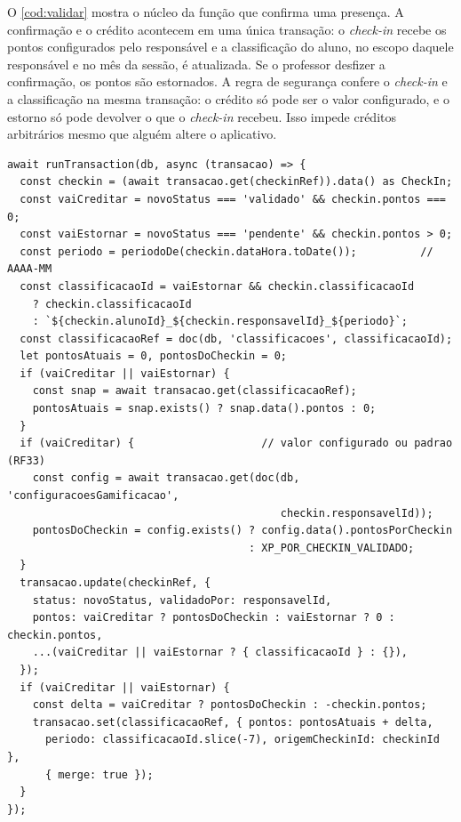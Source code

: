 O \autoref{cod:validar} mostra o núcleo da função que confirma uma
presença. A confirmação e o crédito acontecem em uma única transação: o
\textit{check-in} recebe os pontos configurados pelo responsável e a
classificação do aluno, no escopo daquele responsável e no mês da sessão,
é atualizada. Se o professor desfizer a confirmação, os pontos são
estornados. A regra de segurança confere o \textit{check-in} e a
classificação na mesma transação: o crédito só pode ser o valor
configurado, e o estorno só pode devolver o que o \textit{check-in}
recebeu. Isso impede créditos arbitrários mesmo que alguém altere o
aplicativo.

\begin{codigo}[H]
  \caption{Validação de presença e crédito de pontos (TypeScript, trecho)}
  \label{cod:validar}
\begin{lstlisting}
await runTransaction(db, async (transacao) => {
  const checkin = (await transacao.get(checkinRef)).data() as CheckIn;
  const vaiCreditar = novoStatus === 'validado' && checkin.pontos === 0;
  const vaiEstornar = novoStatus === 'pendente' && checkin.pontos > 0;
  const periodo = periodoDe(checkin.dataHora.toDate());          // AAAA-MM
  const classificacaoId = vaiEstornar && checkin.classificacaoId
    ? checkin.classificacaoId
    : `${checkin.alunoId}_${checkin.responsavelId}_${periodo}`;
  const classificacaoRef = doc(db, 'classificacoes', classificacaoId);
  let pontosAtuais = 0, pontosDoCheckin = 0;
  if (vaiCreditar || vaiEstornar) {
    const snap = await transacao.get(classificacaoRef);
    pontosAtuais = snap.exists() ? snap.data().pontos : 0;
  }
  if (vaiCreditar) {                    // valor configurado ou padrao (RF33)
    const config = await transacao.get(doc(db, 'configuracoesGamificacao',
                                           checkin.responsavelId));
    pontosDoCheckin = config.exists() ? config.data().pontosPorCheckin
                                      : XP_POR_CHECKIN_VALIDADO;
  }
  transacao.update(checkinRef, {
    status: novoStatus, validadoPor: responsavelId,
    pontos: vaiCreditar ? pontosDoCheckin : vaiEstornar ? 0 : checkin.pontos,
    ...(vaiCreditar || vaiEstornar ? { classificacaoId } : {}),
  });
  if (vaiCreditar || vaiEstornar) {
    const delta = vaiCreditar ? pontosDoCheckin : -checkin.pontos;
    transacao.set(classificacaoRef, { pontos: pontosAtuais + delta,
      periodo: classificacaoId.slice(-7), origemCheckinId: checkinId },
      { merge: true });
  }
});
\end{lstlisting}

\end{codigo}

